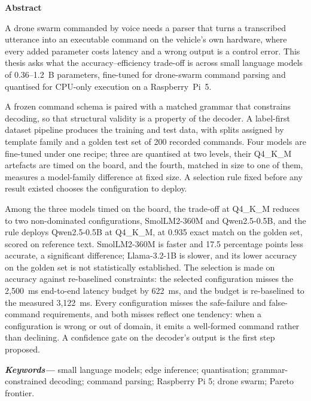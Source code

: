 \thispagestyle{empty}
\vspace*{4cm}
\begin{center}{\Huge\bfseries Abstract}\end{center}
\vskip 1cm
\noindent A drone swarm commanded by voice needs a parser that turns a transcribed utterance into an
executable command on the vehicle's own hardware, where every added parameter costs latency and a
wrong output is a control error. This thesis asks what the accuracy--efficiency trade-off is across
small language models of 0.36--1.2~B parameters, fine-tuned for drone-swarm command parsing and
quantised for CPU-only execution on a Raspberry~Pi~5.

\vspace{0.3cm}
\noindent A frozen command schema is paired with a matched grammar that constrains decoding, so
that structural validity is a property of the decoder. A label-first dataset pipeline produces the
training and test data, with splits assigned by template family and a golden test set of 200
recorded commands. Four models are fine-tuned under one recipe; three are quantised at two levels,
their Q4\_K\_M artefacts are timed on the board, and the fourth, matched in size to one of them,
measures a model-family difference at fixed size. A selection rule fixed before any result existed chooses the configuration to deploy.

\vspace{0.3cm}
\noindent Among the three models timed on the board, the trade-off at Q4\_K\_M reduces to two
non-dominated configurations, SmolLM2-360M and Qwen2.5-0.5B, and the rule deploys Qwen2.5-0.5B at
Q4\_K\_M, at 0.935 exact match on the golden set, scored on reference text. SmolLM2-360M is faster and 17.5 percentage points less accurate, a significant difference;
Llama-3.2-1B is slower, and its lower accuracy on the golden set is not statistically established.
The selection is made on accuracy against re-baselined constraints: the selected configuration
misses the 2{,}500~ms end-to-end latency budget by 622~ms, and the budget is re-baselined to the
measured 3{,}122~ms. Every configuration misses the safe-failure and false-command requirements, and both
misses reflect one tendency: when a configuration is wrong or out of domain, it emits a well-formed
command rather than declining. A confidence gate on the decoder's output is the first step
proposed.

\vspace{1cm}
\providecommand{\keywords}[1]{\textbf{\textit{Keywords---}} #1}
\keywords{small language models; edge inference; quantisation; grammar-constrained decoding;
command parsing; Raspberry Pi 5; drone swarm; Pareto frontier.}
\newpage
